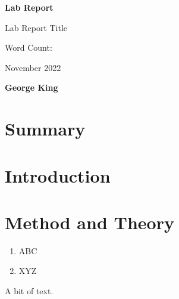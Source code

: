 \documentclass[titlepage,dvipsnames,a4paper,11pt]{article}
\begin{document}
\begin{titlepage}
   
        \vspace*{5cm}
            
        \LARGE
        \textbf{Lab Report}
        
        Lab Report Title
        
        \large{Word Count: }
        
        
        \vspace{1cm}
        \large
        November 2022

        \textbf{George King}


        \vfill
            
    
            
\end{titlepage}
\setlength{\parindent}{0pt}
\setlength{\parskip}{0.3cm}
\renewcommand\refname{}
\renewcommand*\descriptionlabel[1]{\hspace\leftmargin$#1$}
\section{Summary}


\tableofcontents
\newpage
\section{Introduction}



\newpage
\section{Method and Theory}

\begin{enumerate}
    \item ABC
    \item XYZ

\end{enumerate}

A bit of text.
\end{document}
